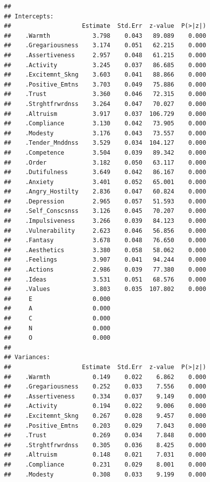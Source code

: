 \documentclass{article}\usepackage[]{graphicx}\usepackage[]{color}
\makeatletter
\newenvironment{kframe}{%
 \def\at@end@of@kframe{}%
 \ifinner\ifhmode%
  \def\at@end@of@kframe{\end{minipage}}%
  \begin{minipage}{\columnwidth}%
 \fi\fi%
 \def\FrameCommand##1{\hskip\@totalleftmargin \hskip-\fboxsep
 \colorbox{shadecolor}{##1}\hskip-\fboxsep
     \hskip-\linewidth \hskip-\@totalleftmargin \hskip\columnwidth}%
 \MakeFramed {\advance\hsize-\width
   \@totalleftmargin\z@ \linewidth\hsize
   \@setminipage}}%
 {\par\unskip\endMakeFramed%
 \at@end@of@kframe}
\newenvironment{knitrout}{}{} %
\makeatother
\begin{document}
\begin{knitrout}
\begin{kframe}
\begin{verbatim}
## 
## Intercepts:
##                    Estimate  Std.Err  z-value  P(>|z|)
##    .Warmth            3.798    0.043   89.089    0.000
##    .Gregariousness    3.174    0.051   62.215    0.000
##    .Assertiveness     2.957    0.048   61.215    0.000
##    .Activity          3.245    0.037   86.685    0.000
##    .Excitemnt_Skng    3.603    0.041   88.866    0.000
##    .Positive_Emtns    3.703    0.049   75.886    0.000
##    .Trust             3.360    0.046   72.315    0.000
##    .Strghtfrwrdnss    3.264    0.047   70.027    0.000
##    .Altruism          3.917    0.037  106.729    0.000
##    .Compliance        3.130    0.042   73.905    0.000
##    .Modesty           3.176    0.043   73.557    0.000
##    .Tender_Mnddnss    3.529    0.034  104.127    0.000
##    .Competence        3.504    0.039   89.342    0.000
##    .Order             3.182    0.050   63.117    0.000
##    .Dutifulness       3.649    0.042   86.167    0.000
##    .Anxiety           3.401    0.052   65.001    0.000
##    .Angry_Hostilty    2.836    0.047   60.824    0.000
##    .Depression        2.965    0.057   51.593    0.000
##    .Self_Conscsnss    3.126    0.045   70.207    0.000
##    .Impulsiveness     3.266    0.039   84.123    0.000
##    .Vulnerability     2.623    0.046   56.856    0.000
##    .Fantasy           3.678    0.048   76.650    0.000
##    .Aesthetics        3.380    0.058   58.062    0.000
##    .Feelings          3.907    0.041   94.244    0.000
##    .Actions           2.986    0.039   77.380    0.000
##    .Ideas             3.531    0.051   68.576    0.000
##    .Values            3.803    0.035  107.802    0.000
##     E                 0.000                           
##     A                 0.000                           
##     C                 0.000                           
##     N                 0.000                           
##     O                 0.000                           
## 
## Variances:
##                    Estimate  Std.Err  z-value  P(>|z|)
##    .Warmth            0.149    0.022    6.862    0.000
##    .Gregariousness    0.252    0.033    7.556    0.000
##    .Assertiveness     0.334    0.037    9.149    0.000
##    .Activity          0.194    0.022    9.006    0.000
##    .Excitemnt_Skng    0.267    0.028    9.457    0.000
##    .Positive_Emtns    0.203    0.029    7.043    0.000
##    .Trust             0.269    0.034    7.848    0.000
##    .Strghtfrwrdnss    0.305    0.036    8.425    0.000
##    .Altruism          0.148    0.021    7.031    0.000
##    .Compliance        0.231    0.029    8.001    0.000
##    .Modesty           0.308    0.033    9.199    0.000

\end{verbatim}
\end{kframe}
\end{knitrout}
\end{document}
